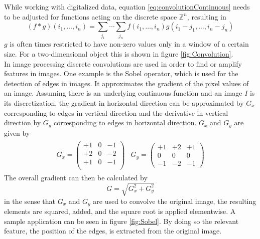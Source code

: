 While working with digitalized data, equation \ref{eq:convolutionContinuous} needs to be adjusted for functions acting on the discrete space $\mathbb{Z}^n$, resulting in
\begin{equation}\label{eq:convolutionDiscrete}
(f*g)(i_1,\dots ,i_n) = \sum_{j_1} \cdots \sum_{j_n} f(i_1,\dots ,i_n) g(i_1-j_1,\dots ,i_n-j_n)
\end{equation}
$g$ is often times restricted to have non-zero values only in a window of a certain size. For a two-dimensional object this is shown in figure \ref{fig:Convolution}. \\

In image processing discrete convolutions are used in order to find or amplify features in images. One example is the Sobel operator, which is used for the detection of edges in images. It approximates the gradient of the pixel values of an image. Assuming there is an underlying continuous function and an image $I$ is its discretization, the gradient in horizontal direction can be approximated by $G_x$ corresponding to edges in vertical direction and the derivative in vertical direction by $G_y$ corresponding to edges in horizontal direction. $G_x$ and $G_y$ are given by
\begin{align}
  \begin{split}
G_x =
\begin{pmatrix}
+1 & 0 & -1 \\
+2 & 0 & -2 \\
+1 & 0 & -1 \\
\end{pmatrix}
\end{split}
\begin{split}
G_y = 
\begin{pmatrix}
+1 & +2 & +1 \\
0 & 0 & 0 \\
-1 & -2 & -1
\end{pmatrix}
\end{split}
\end{align}
The overall gradient can then be calculated by
\begin{equation}
G = \sqrt{G_x^2+G_y^2}
\end{equation}
in the sense that $G_x$ and $G_y$ are used to convolve the original image, the resulting elements are squared, added, and the square root is applied elementwise. A sample application can be seen in figure \ref{fig:Sobel}. By doing so the relevant feature, the position of the edges, is extracted from the original image. \\
